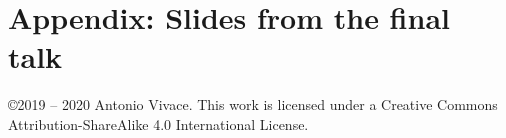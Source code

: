 \documentclass[a4, oneside, 10pt, nobib]{memoir}
\begin{document}



\frontmatter






\pagebreak

\tableofcontents*
\thispagestyle{empty}

\mainmatter






%



\chapter{Appendix: Slides from the final talk}


\glsaddall
\printglossaries

\pagebreak
\listoffigures

\pagebreak
\listoflistings
{}

\printbibheading[title={References}]
\printbibliography[nottype=online, heading=subbibliography, title=Bibliography]
\printbibliography[type=online, heading=subbibliography, title=Sitography]

\pagebreak
\thispagestyle{empty}
\noindent
\copyright 2019 -- 2020 Antonio Vivace. This work is licensed under a Creative Commons Attribution-ShareAlike 4.0 International License.
\end{document}
